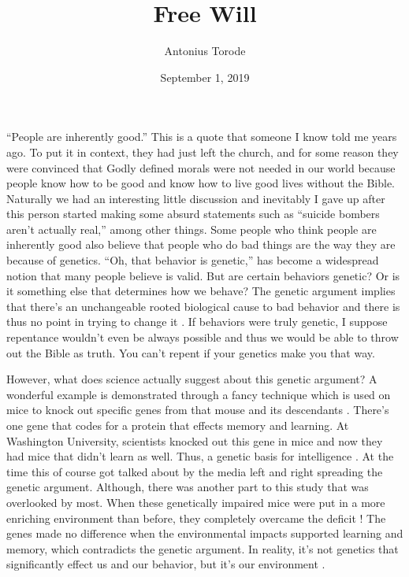 \documentclass[11pt]{article}
\title{Free Will}
\author{Antonius Torode}
\date{September 1, 2019}
\begin{document}
\maketitle
\thispagestyle{fancy}

\begin{multicols}{2}
``People are inherently good.'' This is a quote that someone I know told me years ago. To put it in context, they had just left the church, and for some reason they were convinced that Godly defined morals were not needed in our world because people know how to be good and know how to live good lives without the Bible. Naturally we had an interesting little discussion and inevitably I gave up after this person started making some absurd statements such as ``suicide bombers aren't actually real,'' among other things. Some people who think people are inherently good also believe that people who do bad things are the way they are because of genetics. ``Oh, that behavior is genetic,'' has become a widespread notion that many people believe is valid. But are certain behaviors genetic? Or is it something else that determines how we behave? The genetic argument implies that there's an unchangeable rooted biological cause to bad behavior and there is thus no point in trying to change it \cite{It's genetic}. If behaviors were truly genetic, I suppose repentance wouldn't even be always possible and thus we would be able to throw out the Bible as truth. You can't repent if your genetics make you that way.

However, what does science actually suggest about this genetic argument? A wonderful example is demonstrated through a fancy technique which is used on mice to knock out specific genes from that mouse and its descendants \cite{yang}. There's one gene that codes for a protein that effects memory and learning. At Washington University, scientists knocked out this gene in mice and now they had mice that didn't learn as well. Thus, a genetic basis for intelligence \cite{dumb mice}. At the time this of course got talked about by the media left and right spreading the genetic argument. Although, there was another part to this study that was overlooked by most. When these genetically impaired mice were put in a more enriching environment than before, they completely overcame the deficit \cite{It's genetic}! The genes made no difference when the environmental impacts supported learning and memory, which contradicts the genetic argument. In reality, it's not genetics that significantly effect us and our behavior, but it's our environment \cite{It's genetic}. 


\end{multicols}
\end{document}
